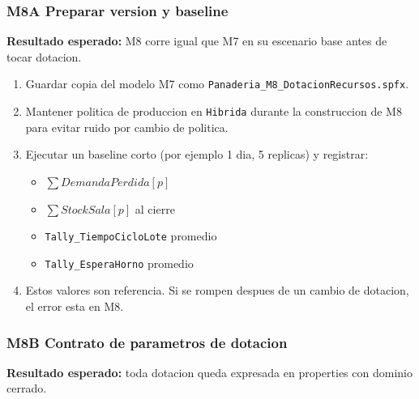 \documentclass[11pt]{article}
\newcommand{\simio}[1]{\texttt{#1}}
\begin{document}
\subsubsection{M8A Preparar version y baseline}
\textbf{Resultado esperado:} M8 corre igual que M7 en su escenario base antes de tocar dotacion.

\begin{enumerate}
  \item Guardar copia del modelo M7 como \simio{Panaderia\_M8\_DotacionRecursos.spfx}.
  \item Mantener politica de produccion en \simio{Hibrida} durante la construccion de M8 para evitar ruido por cambio de politica.
  \item Ejecutar un baseline corto (por ejemplo 1 dia, 5 replicas) y registrar:
  \begin{itemize}
    \item \(\sum DemandaPerdida[p]\)
    \item \(\sum StockSala[p]\) al cierre
    \item \simio{Tally\_TiempoCicloLote} promedio
    \item \simio{Tally\_EsperaHorno} promedio
  \end{itemize}
  \item Estos valores son referencia. Si se rompen despues de un cambio de dotacion, el error esta en M8.
\end{enumerate}

\subsubsection{M8B Contrato de parametros de dotacion}
\textbf{Resultado esperado:} toda dotacion queda expresada en properties con dominio cerrado.
\end{document}
